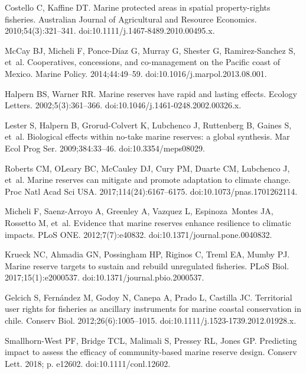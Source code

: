 \documentclass[10pt,letterpaper]{article}
\begin{document}
\begin{thebibliography}{10}
Costello C, Kaffine DT.
\newblock Marine protected areas in spatial property-rights fisheries.
\newblock Australian Journal of Agricultural and Resource Economics.
  2010;54(3):321--341.
\newblock doi:{10.1111/j.1467-8489.2010.00495.x}.

McCay BJ, Micheli F, Ponce-Díaz G, Murray G, Shester G, Ramirez-Sanchez S,
  et~al.
\newblock Cooperatives, concessions, and co-management on the Pacific coast of
  Mexico.
\newblock Marine Policy. 2014;44:49--59.
\newblock doi:{10.1016/j.marpol.2013.08.001}.

Halpern BS, Warner RR.
\newblock Marine reserves have rapid and lasting effects.
\newblock Ecology Letters. 2002;5(3):361--366.
\newblock doi:{10.1046/j.1461-0248.2002.00326.x}.

Lester S, Halpern B, Grorud-Colvert K, Lubchenco J, Ruttenberg B, Gaines S,
  et~al.
\newblock Biological effects within no-take marine reserves: a global
  synthesis.
\newblock Mar Ecol Prog Ser. 2009;384:33--46.
\newblock doi:{10.3354/meps08029}.

Roberts CM, OLeary BC, McCauley DJ, Cury PM, Duarte CM, Lubchenco J, et~al.
\newblock Marine reserves can mitigate and promote adaptation to climate
  change.
\newblock Proc Natl Acad Sci USA. 2017;114(24):6167--6175.
\newblock doi:{10.1073/pnas.1701262114}.

Micheli F, Saenz-Arroyo A, Greenley A, Vazquez L, Espinoza~Montes JA, Rossetto
  M, et~al.
\newblock Evidence that marine reserves enhance resilience to climatic impacts.
\newblock PLoS ONE. 2012;7(7):e40832.
\newblock doi:{10.1371/journal.pone.0040832}.

Krueck NC, Ahmadia GN, Possingham HP, Riginos C, Treml EA, Mumby PJ.
\newblock Marine reserve targets to sustain and rebuild unregulated fisheries.
\newblock PLoS Biol. 2017;15(1):e2000537.
\newblock doi:{10.1371/journal.pbio.2000537}.

Gelcich S, Fernández M, Godoy N, Canepa A, Prado L, Castilla JC.
\newblock Territorial user rights for fisheries as ancillary instruments for
  marine coastal conservation in chile.
\newblock Conserv Biol. 2012;26(6):1005--1015.
\newblock doi:{10.1111/j.1523-1739.2012.01928.x}.

Smallhorn-West PF, Bridge TCL, Malimali S, Pressey RL, Jones GP.
\newblock Predicting impact to assess the efficacy of community-based marine
  reserve design.
\newblock Conserv Lett. 2018; p. e12602.
\newblock doi:{10.1111/conl.12602}.


\end{thebibliography}
\end{document}

